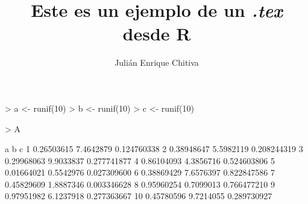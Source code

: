 \documentclass[12pt]{article}
\title{Este es un ejemplo de un \textit{.tex} desde R}
\author{Julián Enrique Chitiva}
\begin{document}

\maketitle
\begin{Schunk}
\begin{Sinput}
> a <- runif(10)
> b <- runif(10)
> c <- runif(10)
\end{Sinput}
\end{Schunk}

\begin{Schunk}
\begin{Sinput}
> A
\end{Sinput}
\begin{Soutput}
            a         b           c
1  0.26503615 7.4642879 0.124760338
2  0.38948647 5.5982119 0.208244319
3  0.29968063 9.9033837 0.277741877
4  0.86104093 4.3856716 0.524603806
5  0.01664021 0.5542976 0.027309600
6  0.38869429 7.6576397 0.822847586
7  0.45829609 1.8887346 0.003346628
8  0.95960254 0.7099013 0.766477210
9  0.97951982 6.1237918 0.277363667
10 0.45780596 9.7214055 0.289730927
\end{Soutput}
\end{Schunk}
\end{document}
